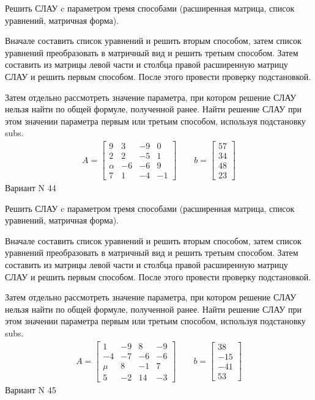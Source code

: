 \documentclass[11pt]{report}
\begin{document}
Решить СЛАУ c параметром тремя способами (расширенная матрица, список уравнений, матричная форма).

Вначале составить список уравнений и решить вторым способом,
затем список уравнений преобразовать в матричный вид и решить третьим способом.
Затем составить из матрицы левой части и столбца правой расширенную матрицу СЛАУ и решить первым способом.
После этого провести проверку подстановкой.

Затем отдельно рассмотреть значение параметра, при котором решение СЛАУ нельзя найти по общей формуле,
полученной ранее.
Найти решение СЛАУ при этом значении параметра первым или третьим способом, используя подстановку subs.
\begin{align*}
    A = \left[\begin{matrix}9 & 3 & -9 & 0\\2 & 2 & -5 & 1\\\alpha & -6 & -6 & 9\\7 & 1 & -4 & -1\end{matrix}\right]
\qquad b = \left[\begin{matrix}57\\34\\48\\23\end{matrix}\right]
\end{align*}
\newpage
Вариант N 44


Решить СЛАУ c параметром тремя способами (расширенная матрица, список уравнений, матричная форма).

Вначале составить список уравнений и решить вторым способом,
затем список уравнений преобразовать в матричный вид и решить третьим способом.
Затем составить из матрицы левой части и столбца правой расширенную матрицу СЛАУ и решить первым способом.
После этого провести проверку подстановкой.

Затем отдельно рассмотреть значение параметра, при котором решение СЛАУ нельзя найти по общей формуле,
полученной ранее.
Найти решение СЛАУ при этом значении параметра первым или третьим способом, используя подстановку subs.
\begin{align*}
    A = \left[\begin{matrix}1 & -9 & 8 & -9\\-4 & -7 & -6 & -6\\\mu & 8 & -1 & 7\\5 & -2 & 14 & -3\end{matrix}\right]
\qquad b = \left[\begin{matrix}38\\-15\\-41\\53\end{matrix}\right]
\end{align*}
\newpage
Вариант N 45
\end{document}
